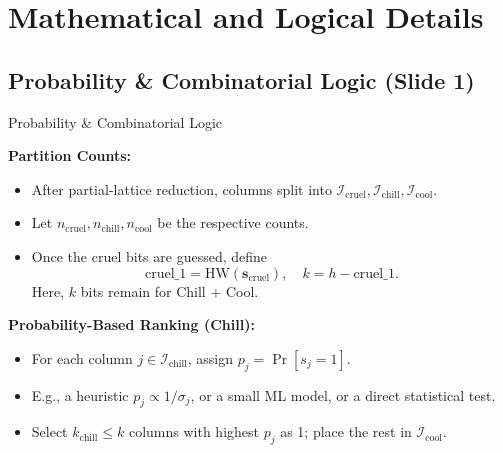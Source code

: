 \documentclass{beamer}
\begin{document}
\section{Mathematical and Logical Details}
\label{sec:math-logic}

\subsection*{Probability \& Combinatorial Logic (Slide 1)}
\begin{frame}{Probability \& Combinatorial Logic}

\textbf{Partition Counts:}
\begin{itemize}
  \item After partial-lattice reduction, columns split into $\mathcal{I}_{\mathrm{cruel}}, \mathcal{I}_{\mathrm{chill}}, \mathcal{I}_{\mathrm{cool}}$.
  \item Let $n_{\mathrm{cruel}}, n_{\mathrm{chill}}, n_{\mathrm{cool}}$ be the respective counts.
  \item Once the $\mathrm{cruel}$ bits are guessed, define 
    \[
      \mathrm{cruel\_1} = \mathrm{HW}(\mathbf{s}_{\mathrm{cruel}}), 
      \quad
      k = h - \mathrm{cruel\_1}.
    \]
    Here, $k$ bits remain for Chill + Cool.
\end{itemize}

\textbf{Probability-Based Ranking (Chill):}
\begin{itemize}
  \item For each column $j \in \mathcal{I}_{\mathrm{chill}}$, assign $p_j = \Pr[s_j = 1]$.
  \item E.g., a heuristic $p_j \propto 1/\sigma_j$, or a small ML model, or a direct statistical test.
  \item Select $k_{\mathrm{chill}} \le k$ columns with highest $p_j$ as 1; place the rest in $\mathcal{I}_{\mathrm{cool}}$.
\end{itemize}

\end{frame}
\end{document}
